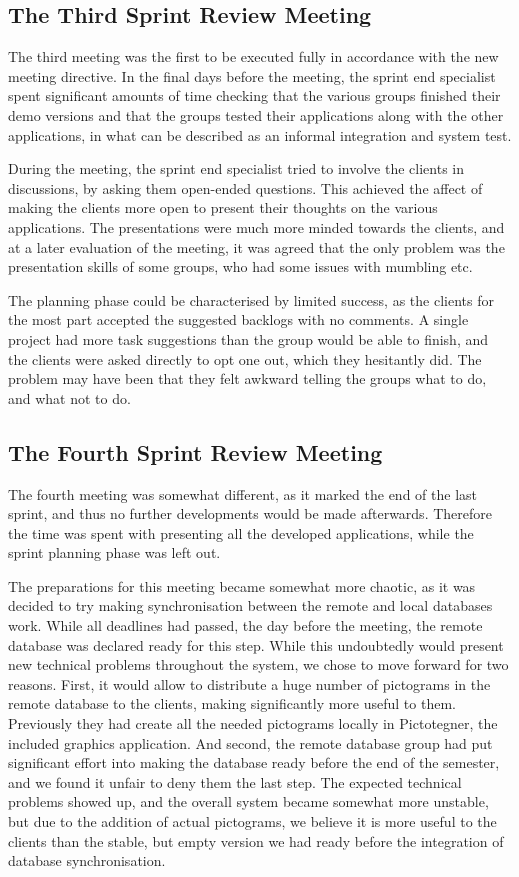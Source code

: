 \subsection{The Third Sprint Review Meeting}
\label{collab:sprintend:three}
The third meeting was the first to be executed fully in accordance with the new meeting directive. In the final days before the meeting, the sprint end specialist spent significant amounts of time checking that the various groups finished their demo versions and that the groups tested their applications along with the other applications, in what can be described as an informal integration and system test. 

During the meeting, the sprint end specialist tried to involve the clients in discussions, by asking them open-ended questions. This achieved the affect of making the clients more open to present their thoughts on the various applications. The presentations were much more minded towards the clients, and at a later evaluation of the meeting, it was agreed that the only problem was the presentation skills of some groups, who had some issues with mumbling etc.

The planning phase could be characterised by limited success, as the clients for the most part accepted the suggested backlogs with no comments. A single project had more task suggestions than the group would be able to finish, and the clients were asked directly to opt one out, which they hesitantly did. The problem may have been that they felt awkward telling the groups what to do, and what not to do.

\subsection{The Fourth Sprint Review Meeting}
\label{collab:sprintend:four}
The fourth meeting was somewhat different, as it marked the end of the last sprint, and thus no further developments would be made afterwards. Therefore the time was spent with presenting all the developed applications, while the sprint planning phase was left out. 

The preparations for this meeting became somewhat more chaotic, as it was decided to try making synchronisation between the remote and local databases work. While all deadlines had passed, the day before the meeting, the remote database was declared ready for this step. While this undoubtedly would present new technical problems throughout the system, we chose to move forward for two reasons. First, it would allow to distribute a huge number of pictograms in the remote database to the clients, making \giraf significantly more useful to them. Previously they had create all the needed pictograms locally in Pictotegner, the included graphics application. And second, the remote database group had put significant effort into making the database ready before the end of the semester, and we found it unfair to deny them the last step. The expected technical problems showed up, and the overall system became somewhat more unstable, but due to the addition of actual pictograms, we believe it is more useful to the clients than the stable, but empty version we had ready before the integration of database synchronisation.



